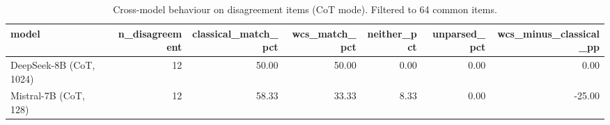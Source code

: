 \begin{table}
\caption{Cross-model behaviour on disagreement items (CoT mode). Filtered to 64 common items.}
\label{tab:disagreement_none_cot}
\begin{tabular}{lrrrrrr}
\toprule
model & n_disagreement & classical_match_pct & wcs_match_pct & neither_pct & unparsed_pct & wcs_minus_classical_pp \\
\midrule
DeepSeek-8B (CoT, 1024) & 12 & 50.00 & 50.00 & 0.00 & 0.00 & 0.00 \\
Mistral-7B (CoT, 128) & 12 & 58.33 & 33.33 & 8.33 & 0.00 & -25.00 \\
\bottomrule
\end{tabular}
\end{table}
